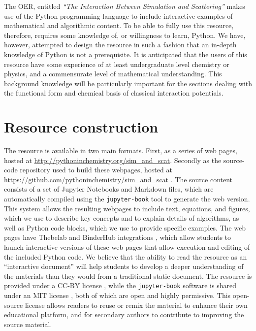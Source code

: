 \documentclass[amsmath,amssymb,twocolumn,superscriptaddress]{revtex4-1}
\begin{document}
The OER, entitled \emph{``The Interaction Between Simulation and Scattering''} makes use of the Python programming language to include interactive examples of mathematical and algorithmic content.
To be able to fully use this resource, therefore, requires some knowledge of, or willingness to learn, Python.
We have, however, attempted to design the resource in such a fashion that an in-depth knowledge of Python is not a prerequisite.
It is anticipated that the users of this resource have some experience of at least undergraduate level chemistry or physics, and a commensurate level of mathematical understanding.
This background knowledge will be particularly important for the sections dealing with the functional form and chemical basis of classical interaction potentials.

\section{Resource construction}

The resource is available in two main formats. First, as a series of web pages, hosted at \url{http://pythoninchemistry.org/sim_and_scat}.
Secondly as the source-code repository used to build these webpages, hosted at \url{https://github.com/pythoninchemistry/sim_and_scat} \cite{mccluskey_pythoninchemistry/sim_and_scat_2019}.
The source content consists of a set of Jupyter Notebooks and Markdown files, which are automatically compiled using the \texttt{jupyter-book} tool \cite{lau_jupyter/jupyter-book_2019} to generate the web version.
This system allows the resulting webpages to include text, equations, and figures, which we use to describe key concepts and to explain details of algorithms, as well as Python code blocks, which we use to provide specific examples. The web pages have Thebelab and BinderHub integrations \cite{ragan-kelley_minrk/thebelab_2019, ragan-kelley_jupyterhub/binderhub_2019, jupyter_binder_2018}, which allow students to launch interactive versions of these web pages that allow execution and editing of the included Python code.
We believe that the ability to read the resource as an ``interactive document'' will help students to develop a deeper understanding of the materials than they would from a traditional static document.
The resource is provided under a CC-BY license \cite{creative_commons_creative_2019}, while the \texttt{jupyter-book} software is shared under an MIT license \cite{open_source_mit_2019}, both of which are open and highly permissive.
This open-source license allows readers to reuse or remix the material to enhance their own educational platform, and for secondary authors to contribute to improving the source material.
\end{document}
